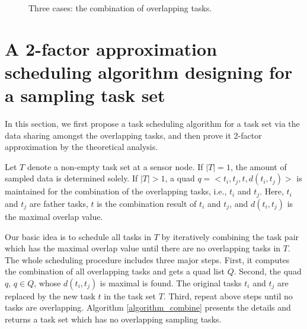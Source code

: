 \documentclass[prodmode,acmtosn]{acmsmall}
\begin{document}
\begin{figure}
\centering
{}
\hspace{2pt}
\hspace{2pt}
\caption{Three cases: the combination of overlapping tasks.}
\label{figure_combination}
\end{figure}


\section{A 2-factor approximation scheduling algorithm designing for a sampling task set}
\label{section_schedule}
In this section, we first propose a task scheduling algorithm for a task set via the data sharing amongst the overlapping tasks, and then prove it 2-factor approximation by the theoretical analysis.

Let $T$ denote a non-empty task set at a sensor node. If $|T|\mathrm{=}1$, the amount of sampled data is determined solely. If $|T|\mathrm{>}1$, a quad $q\mathrm{=<}t_i,t_j,t,d(t_i,t_j)\mathrm{>}$ is maintained for the combination of the overlapping tasks, i.e., $t_i$ and $t_j$. Here,  $t_i$ and $t_j$ are father tasks,  $t$ is the combination result of $t_i$ and $t_j$, and $d(t_i,t_j)$ is the maximal overlap value.

Our basic idea is to schedule all tasks in $T$ by iteratively combining the task pair which has the maximal overlap value until there are no overlapping tasks in $T$. The whole scheduling procedure includes three major steps. First, it computes the combination of all overlapping tasks and gets a quad list $Q$. Second, the quad $q$, $q\mathrm{\in} Q$, whose $d(t_i,t_j)$ is maximal is found. The original tasks $t_i$ and $t_j$ are replaced by the new task $t$ in the task set  $T$. Third, repeat above steps until no tasks are overlapping. Algorithm \ref{algorithm_combine} presents the details and returns a task set which has no overlapping sampling tasks.
\end{document}
